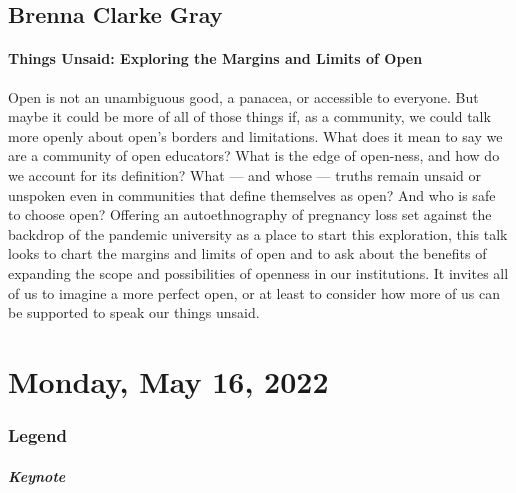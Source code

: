 \documentclass[
]{book}
\begin{document}
\hypertarget{brenna-clarke-gray}{%
\section*{Brenna Clarke Gray}\label{brenna-clarke-gray}}

\begin{reflect}
\hypertarget{things-unsaid-exploring-the-margins-and-limits-of-open}{%
\subsubsection{Things Unsaid: Exploring the Margins and Limits of
Open}\label{things-unsaid-exploring-the-margins-and-limits-of-open}}

Open is not an unambiguous good, a panacea, or accessible to everyone.
But maybe it could be more of all of those things if, as a community, we
could talk more openly about open's borders and limitations. What does
it mean to say we are a community of open educators? What is the edge of
open-ness, and how do we account for its definition? What --- and whose
--- truths remain unsaid or unspoken even in communities that define
themselves as open? And who is safe to choose open? Offering an
autoethnography of pregnancy loss set against the backdrop of the
pandemic university as a place to start this exploration, this talk
looks to chart the margins and limits of open and to ask about the
benefits of expanding the scope and possibilities of openness in our
institutions. It invites all of us to imagine a more perfect open, or at
least to consider how more of us can be supported to speak our things
unsaid.
\end{reflect}

\hypertarget{monday-may-16-2022}{%
\chapter{Monday, May 16, 2022}\label{monday-may-16-2022}}

\hypertarget{legend}{%
\subsection*{Legend}\label{legend}}

\begin{reflect}
\hypertarget{keynote}{%
\paragraph{Keynote}\label{keynote}}
\end{reflect}
\end{document}
